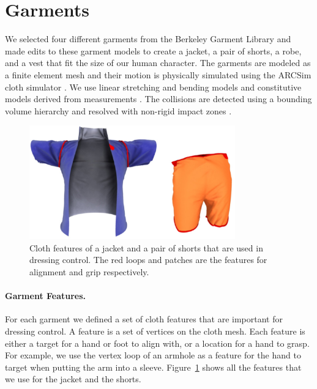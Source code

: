 \section{Garments}
We selected four different garments from the Berkeley Garment Library and made
edits to these garment models to create a jacket, a pair of
shorts, a robe, and a vest that fit the size of our human character. The
garments are modeled as a finite element mesh and their motion is
physically simulated
using the ARCSim cloth simulator \cite{Narain:2012:AAR}. We use linear
stretching and bending models and constitutive models derived from
measurements \cite{Wang:2011}. The collisions are detected using a
bounding volume hierarchy \cite{Tang:2010} and resolved with non-rigid
impact zones \cite{Harmon:2008}.

\begin{figure}[!t]
  \centering
  \includegraphics[width=3.5in]{images/features}
  \caption{Cloth features of a jacket and a pair of shorts that are used in dressing control. The red loops and patches are the features for alignment and grip respectively.}
  \label{fig:features}
\end{figure}


\paragraph{Garment Features.} For each garment we defined a set of cloth
features that are important for dressing control. A feature is a set of
vertices on the cloth mesh.  Each feature is either a target for a hand or
foot to align with, or a location for a hand to grasp.  For example, we
use the vertex loop of an armhole as a feature for the hand to target when
putting the arm into a sleeve.  Figure~\ref{fig:features} shows all the
features that we use for the jacket and the shorts.
